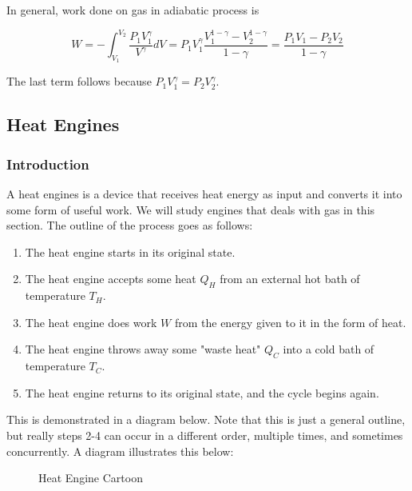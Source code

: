 \documentclass[12pt, a4paper]{article}
\begin{document}
In general, work done on gas in adiabatic process is

\[W=-\int_{V_1}^{V_2} \frac{P_1V_1^\gamma}{V^\gamma} dV=P_1V_1^\gamma \frac{V_1^{1-\gamma}-V_2^{1-\gamma}}{1-\gamma}=\frac{P_1V_1-P_2V_2}{1-\gamma}\]

The last term follows because $P_1V_1^\gamma = P_2V_2^\gamma$.

\subsection{Heat Engines}

\subsubsection{Introduction}

A heat engines is a device that receives heat energy as input and converts it into some form of useful work. We will study engines that deals with gas in this section. The outline of the process goes as follows:

\begin{enumerate}
    \item The heat engine starts in its original state.
    \item The heat engine accepts some heat $Q_H$ from an external hot bath of temperature $T_H$.
    \item The heat engine does work $W$ from the energy given to it in the form of heat.
    \item The heat engine throws away some "waste heat" $Q_C$ into a cold bath of temperature $T_C$.
    \item The heat engine returns to its original state, and the cycle begins again.
\end{enumerate}

This is demonstrated in a diagram below. Note that this is just a general outline, but really steps 2-4 can occur in a different order, multiple times, and sometimes concurrently. A diagram illustrates this below:

\begin{figure}[H]
    \centering
    \caption{Heat Engine Cartoon}
\end{figure}
\end{document}
